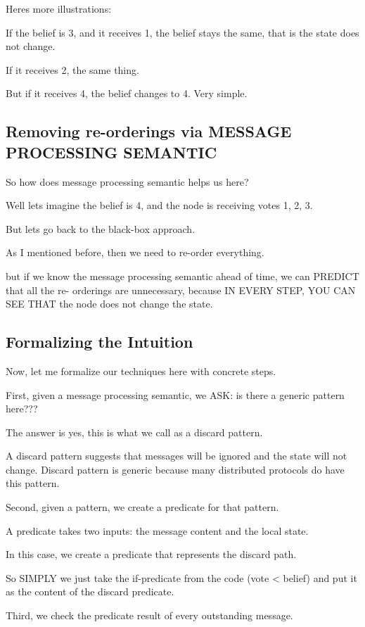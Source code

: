 Heres more illustrations:

If the belief is 3, and it receives 1, the belief stays the same, that is the
state does not change.

If it receives 2, the same thing.

But if it receives 4, the belief changes to 4. Very simple.

\subsection{Removing re-orderings via MESSAGE PROCESSING SEMANTIC}

So how does message processing semantic helps us here?

Well lets imagine the belief is 4, and the node is receiving votes 1, 2, 3.

But lets go back to the black-box approach.

As I mentioned before, then we need to re-order everything.

but if we know the message processing semantic ahead of time, we can PREDICT
that all the re- orderings are unnecessary, because IN EVERY STEP, YOU CAN SEE
THAT the node does not change the state.

\subsection{Formalizing the Intuition}

Now, let me formalize our techniques here with concrete steps.

First, given a message processing semantic, we ASK: is there a generic pattern
here???

The answer is yes, this is what we call as a discard pattern.

A discard pattern suggests that messages will be ignored and the state will
not change. Discard pattern is generic because many distributed protocols do
have this pattern.

Second, given a pattern, we create a predicate for that pattern.

A predicate takes two inputs: the message content and the local state.

In this case, we create a predicate that represents the discard path.

So SIMPLY we just take the if-predicate from the code (vote < belief) and put it
as the content of the discard predicate.

Third, we check the predicate result of every outstanding message.

